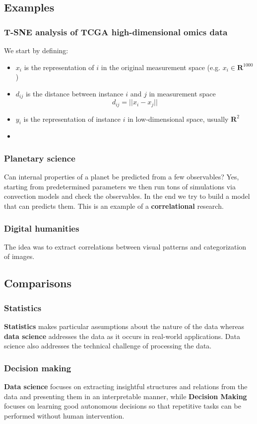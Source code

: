 \subsection{Examples}
\subsubsection{T-SNE analysis of TCGA high-dimensional omics data}
We start by defining:
\begin{itemize}
	\item $x_i$ is the representation of $i$ in the original measurement space (e.g. $x_i \in \mathbf{R}^{1000}$)
	\item $d_{ij}$ is the distance between instance $i$ and $j$ in measurement space
	\begin{equation*}
		d_{ij} = \lvert\lvert x_i - x_j \rvert\rvert
	\end{equation*}
	\item $y_i$ is the representation of instance $i$ in low-dimensional space, usually $\mathbf{R}^2$
	\item 
\end{itemize}

\subsubsection{Planetary science}
Can internal properties of a planet be predicted from a few observables? Yes, starting from predetermined parameters we then run tons of simulations via convection models and check the observables. In the end we try to build a model that can predicts them. This is an example of a \textbf{correlational} research.

 \subsubsection{Digital humanities}
 The idea was to extract correlations between visual patterns and categorization of images.
 
 \subsection{Comparisons}
 \subsubsection{Statistics}
 \textbf{Statistics} makes particular assumptions about the nature of the data whereas \textbf{data science} addresses the data as it occurs in real-world applications. Data science also addresses the technical challenge of processing the data.
 \subsubsection{Decision making}
 \textbf{Data science} focuses on extracting insightful structures and relations from the data and presenting them in an interpretable manner, while \textbf{Decision Making} focuses on learning good autonomous decisions so that repetitive tasks can be performed without human intervention.
 